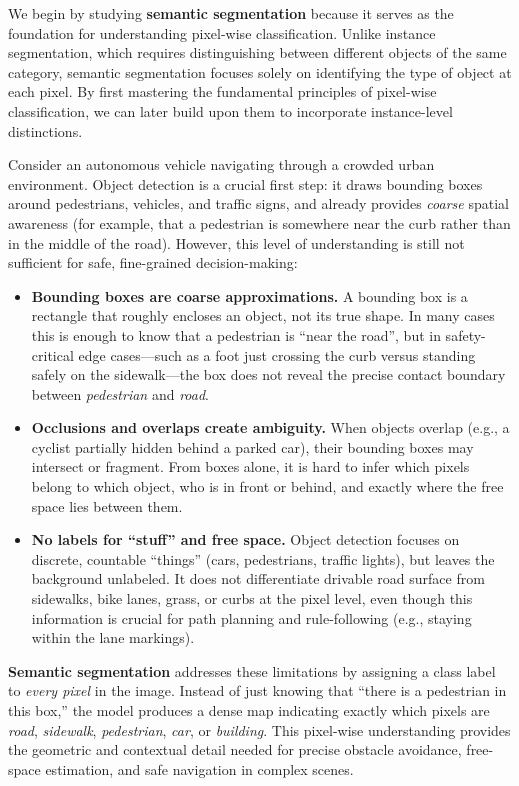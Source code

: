 \noindent We begin by studying \textbf{semantic segmentation} because it serves as the foundation for understanding pixel-wise classification. Unlike instance segmentation, which requires distinguishing between different objects of the same category, semantic segmentation focuses solely on identifying the type of object at each pixel. 
By first mastering the fundamental principles of pixel-wise classification, we can later build upon them to incorporate instance-level distinctions.

\begin{enrichment}
	\noindent
	Consider an autonomous vehicle navigating through a crowded urban environment. Object detection is a crucial first step: it draws bounding boxes around pedestrians, vehicles, and traffic signs, and already provides \emph{coarse} spatial awareness (for example, that a pedestrian is somewhere near the curb rather than in the middle of the road). However, this level of understanding is still not sufficient for safe, fine-grained decision-making:
	
	\begin{itemize}
		\item \textbf{Bounding boxes are coarse approximations.} A bounding box is a rectangle that roughly encloses an object, not its true shape. In many cases this is enough to know that a pedestrian is “near the road”, but in safety-critical edge cases—such as a foot just crossing the curb versus standing safely on the sidewalk—the box does not reveal the precise contact boundary between \textit{pedestrian} and \textit{road}.
		
		\item \textbf{Occlusions and overlaps create ambiguity.} When objects overlap (e.g., a cyclist partially hidden behind a parked car), their bounding boxes may intersect or fragment. From boxes alone, it is hard to infer which pixels belong to which object, who is in front or behind, and exactly where the free space lies between them.
		
		\item \textbf{No labels for “stuff” and free space.} Object detection focuses on discrete, countable “things” (cars, pedestrians, traffic lights), but leaves the background unlabeled. It does not differentiate drivable road surface from sidewalks, bike lanes, grass, or curbs at the pixel level, even though this information is crucial for path planning and rule-following (e.g., staying within the lane markings).
	\end{itemize}
	
	\medskip \noindent
	\textbf{Semantic segmentation} addresses these limitations by assigning a class label to \emph{every pixel} in the image. Instead of just knowing that “there is a pedestrian in this box,” the model produces a dense map indicating exactly which pixels are \textit{road}, \textit{sidewalk}, \textit{pedestrian}, \textit{car}, or \textit{building}. This pixel-wise understanding provides the geometric and contextual detail needed for precise obstacle avoidance, free-space estimation, and safe navigation in complex scenes.
\end{enrichment}
	
